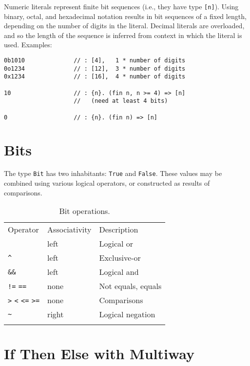 Numeric literals represent finite bit sequences (i.e., they have type
\texttt{{[}n{]}}). Using binary, octal, and hexadecimal notation results
in bit sequences of a fixed length, depending on the number of digits in
the literal. Decimal literals are overloaded, and so the length of the
sequence is inferred from context in which the literal is used.
Examples:

\begin{verbatim}
0b1010              // : [4],   1 * number of digits
0o1234              // : [12],  3 * number of digits
0x1234              // : [16],  4 * number of digits

10                  // : {n}. (fin n, n >= 4) => [n]
                    //   (need at least 4 bits)

0                   // : {n}. (fin n) => [n]
\end{verbatim}

\section{Bits}\label{bits}

The type \texttt{Bit} has two inhabitants: \texttt{True} and
\texttt{False}. These values may be combined using various logical
operators, or constructed as results of comparisons.

\begin{longtable}[c]{@{}lll@{}}
\toprule\addlinespace
Operator & Associativity & Description
\\\addlinespace
\midrule\endhead
\texttt{\textbar{}\textbar{}} & left & Logical or
\\\addlinespace
\texttt{\^{}} & left & Exclusive-or
\\\addlinespace
\texttt{\&\&} & left & Logical and
\\\addlinespace
\texttt{!=} \texttt{==} & none & Not equals, equals
\\\addlinespace
\texttt{\textgreater{}} \texttt{\textless{}} \texttt{\textless{}=}
\texttt{\textgreater{}=} & none & Comparisons
\\\addlinespace
\texttt{\textasciitilde{}} & right & Logical negation
\\\addlinespace
\bottomrule
\addlinespace
\caption{Bit operations.}
\end{longtable}

\section{If Then Else with Multiway}\label{if-then-else-with-multiway}

